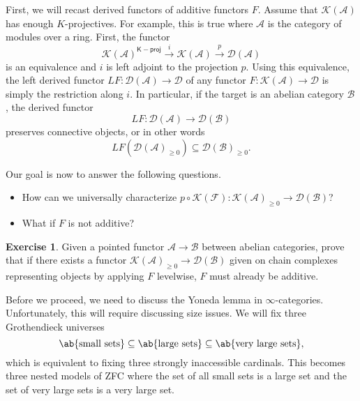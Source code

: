 \documentclass[10pt, oneside]{memoir}
\theoremstyle{definition}
\newtheorem{exer}[thm]{Exercise}
\theoremstyle{remark}
\theoremstyle{plain}
\theoremstyle{definition}
\theoremstyle{remark}
\newcommand{\mc}[1]{\mathcal{#1}}
\newcommand{\ms}[1]{\mathsf{#1}}
\newcommand{\1}{\mathbf{1}}
\newcommand{\2}{\mathbf{2}}
\newcommand{\3}{\mathbf{3}}
\begin{document}
First, we will recast derived functors of additive functors $F$. Assume that $\mc{K}(\mc{A})$ has enough $K$-projectives. For example, this is true where $\mc{A}$ is the category of modules over a ring. First, the functor
\[ \mc{K}(\mc{A})^{\ms{K-proj}} \xrightarrow{i} \mc{K}(\mc{A}) \xrightarrow{p} \mc{D}(\mc{A}) \]
is an equivalence and $i$ is left adjoint to the projection $p$. Using this equivalence, the left derived functor $LF \colon \mc{D}(\mc{A}) \to \mc{D}$ of any functor $F \colon \mc{K}(\mc{A}) \to \mc{D}$ is simply the restriction along $i$. In particular, if the target is an abelian category $\mc{B}$, the derived functor
\[ LF \colon \mc{D}(\mc{A}) \to \mc{D}(\mc{B}) \]
preserves connective objects, or in other words
\[ LF(\mc{D}(\mc{A})_{\geq 0}) \subseteq \mc{D}(\mc{B})_{\geq 0}. \]

Our goal is now to answer the following questions.
\begin{itemize}
    \item How can we universally characterize $p \circ \mc{K}(\mc{F}) \colon \mc{K}(\mc{A})_{\geq 0} \to \mc{D}(\mc{B})$?
    \item What if $F$ is not additive?
\end{itemize}

\begin{exer}
    Given a pointed functor $\mc{A} \to \mc{B}$ between abelian categories, prove that if there exists a functor $\mc{K}(\mc{A})_{\geq 0} \to \mc{D}(\mc{B})$ given on chain complexes representing objects by applying $F$ levelwise, $F$ must already be additive.
\end{exer}

Before we proceed, we need to discuss the Yoneda lemma in $\infty$-categories. Unfortunately, this will require discussing size issues. We will fix three Grothendieck universes
\[ \ab\{ \text{small sets}\} \subseteq \ab\{ \text{large sets} \} \subseteq \ab\{ \text{very large sets} \}, \]
which is equivalent to fixing three strongly inaccessible cardinals. This becomes three nested models of ZFC where the set of all small sets is a large set and the set of very large sets is a very large set.
\end{document}
